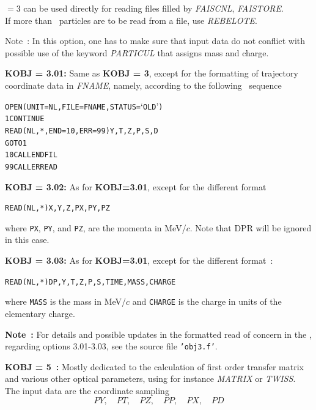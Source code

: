 \bigskip

\noindent\KOBJ $= 3 $    can be used directly for reading files filled by \textsl{FAISCNL}, \textsl{FAISTORE}.\\
If more than \IMAX\ particles are to be read from a file, use  \textsl{REBELOTE}.   

\bigskip

\noindent Note~: In this option, one has to make sure that input data do not conflict with possible use of 
the keyword \textsl{PARTICUL} that  assigns   mass and charge.

\bigskip

\noindent\textbf{KOBJ = 3.01:} Same as \textbf{KOBJ = 3}, except for the formatting of trajectory coordinate 
data in  \textsl{FNAME}, namely, according to the following \FORTRAN\ sequence 
\begin{alltt}
\footnotesize
         OPEN (UNIT = NL, FILE = FNAME, STATUS = `OLD')
    1    CONTINUE
         READ (NL,*,END=10,ERR=99) Y, T, Z, P, S, D
         GOTO 1
   10    CALL ENDFIL
   99    CALL ERREAD
\end{alltt} 

\bigskip

\noindent\textbf{KOBJ = 3.02:} As for \textbf{KOBJ=3.01}, except for the different format
\begin{alltt}
         READ(NL,*) X,Y,Z,PX,PY,PZ
\end{alltt}
where \texttt{PX}, \texttt{PY}, and \texttt{PZ}, are the momenta in
MeV/$c$.  Note that DPR will be ignored in this case.

\bigskip

\noindent\textbf{KOBJ = 3.03:} As for \textbf{KOBJ=3.01}, except for the different format~: 
\begin{alltt}
         READ(NL,*) DP,Y,T,Z,P,S,TIME,MASS,CHARGE
\end{alltt}
where \texttt{MASS} is the mass in MeV/$c$ and \texttt{CHARGE} is the
charge in units of the elementary charge.  



\bigskip

\noindent \textbf{Note~:}  For details and possible updates in the formatted read of concern in the \FORTRAN, 
regarding options 3.01-3.03, see the source file \texttt{'obj3.f'}.


\bigskip


\noindent\textbf{KOBJ = 5~:} Mostly dedicated to the calculation of first order
transfer matrix and various other  optical parameters, 
 using for instance \textsl{MATRIX} or \textsl{TWISS}.  
The input data are the coordinate sampling 
\smallskip
$$ PY,\quad PT,\quad PZ,\quad PP, \quad PX, \quad PD $$

